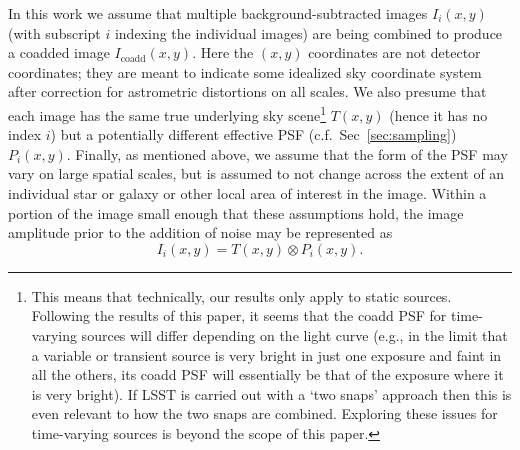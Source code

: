 \documentclass{aastex63}
\begin{document}
In this work we assume that multiple background-subtracted images $I_i(x,y)$ (with subscript $i$ indexing the individual images) are being combined to produce a coadded image $I_\text{coadd}(x,y)$.  Here the $(x,y)$ coordinates are not detector coordinates; they are meant to indicate some idealized sky coordinate system after correction for astrometric distortions on all scales. We also presume that each image has the same true underlying sky scene\footnote{This means that technically, our results only apply to static sources.  Following the results of this paper, it seems that the coadd PSF for time-varying sources will differ depending on the light curve (e.g., in the limit that a variable or transient source is very bright in just one exposure and faint in all the others, its coadd PSF will essentially be that of the exposure where it is very bright). If LSST is carried out with a `two snaps' approach then this is even relevant to how the two snaps are combined. Exploring these issues for time-varying sources is beyond the scope of this paper.} $T(x,y)$ (hence it has no index $i$) but a potentially different effective PSF (c.f.\ Sec~\ref{sec:sampling})
$P_i(x,y)$.  Finally, as mentioned above, we assume that the form of the PSF may vary on large spatial scales, but is assumed to not change across the extent of an individual star or galaxy or other local area of interest in the image.  Within a portion of the image small enough that these assumptions hold, the image amplitude prior to the addition of noise may be represented as
\begin{equation}
I_i(x,y) = T(x,y) \otimes P_i(x,y).
\end{equation}
\end{document}

